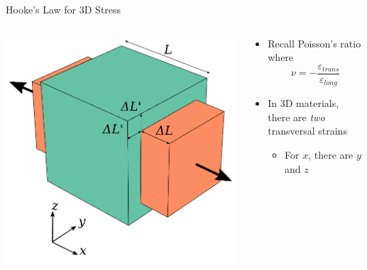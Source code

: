 \documentclass[10pt, svgnames]{beamer}
\begin{document}
\begin{frame}[label={sec:orgd69c561}]{Hooke's Law for 3D Stress}
\begin{columns}
\begin{column}{0.4\columnwidth}
\begin{center}
\includegraphics[width=\textwidth]{pictures/3d-poisson.png}
\end{center}
\end{column}

\begin{column}{0.6\columnwidth}
\begin{itemize}
\item Recall Poisson's ratio where
\[\nu = - \dfrac{\varepsilon_{trans}}{\varepsilon_{long}}\]

\item In 3D materials, there are \emph{two} transversal strains

\begin{itemize}
\item For \(x\), there are \(y\) and \(z\)
\end{itemize}
\end{itemize}
\end{column}
\end{columns}
\end{frame}
\end{document}
